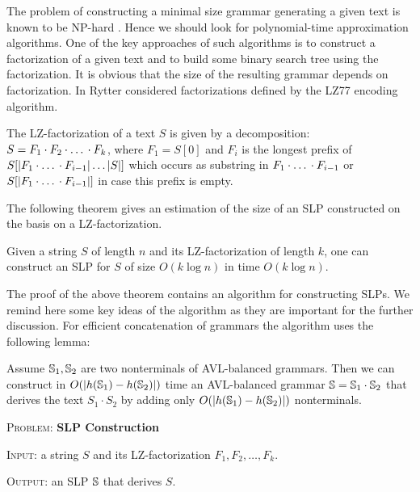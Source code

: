 \documentclass[10pt]{article}
\begin{document}
The problem of constructing a minimal size grammar generating a given text is known to be NP-hard \cite{SmallestCFG}. Hence we
should look for polynomial-time approximation algorithms. One of the key approaches of such algorithms is to construct a
factorization of a given text and to build some binary search tree using the factorization. It is obvious that the size
of the resulting grammar depends on factorization. In \cite{SLPConstruction} Rytter considered factorizations defined by
the LZ77 encoding algorithm.

\begin{definition}
The LZ-factorization of a text $S$ is given by a decomposition: $S = F_1 \cdot F_2 \cdot \mbox{\dots} \cdot F_k$, where
$F_1 = S[0]$ and $F_i$ is the longest prefix of $S[|F_1\cdot \mbox{\dots} \cdot F_{i-1}|\dots|S|]$ which occurs as
substring in $F_1 \cdot \mbox{\dots} \cdot F_{i-1}$ or $S[|F_1\cdot \mbox{\dots} \cdot F_{i-1}|]$ in case this prefix is
empty.
\end{definition}

The following theorem gives an estimation of the size of an SLP constructed on the basis on a LZ-factorization.

\begin{thm}
Given a string $S$ of length $n$ and its LZ-factorization of length $k$, one can construct an SLP for $S$ of size $O(k
\log n)$ in time $O(k \log n)$.
\end{thm}

The proof of the above theorem contains an algorithm for constructing SLPs. We remind here some key ideas of the
algorithm as they are important for the further discussion. For efficient concatenation of grammars the algorithm uses
the following lemma:

\begin{lem}
Assume $\mathbb{S}_1, \mathbb{S}_2$ are two nonterminals of AVL-balanced grammars. Then we can construct in $O(|h(\mathbb{S}_1) -
h(\mathbb{S}_2)|)$ time an AVL-balanced grammar $\mathbb{S} = \mathbb{S}_1 \cdot \mathbb{S}_2$ that derives the text $S_1\cdot S_2$
by adding only $O(|h(\mathbb{S}_1) - h(\mathbb{S}_2)|)$ nonterminals.
\end{lem}


\noindent \textsc{Problem:} \textbf{SLP Construction}

\noindent \textsc{Input:} a string $S$ and its LZ-factorization $F_1, F_2, \dots, F_k$.

\noindent \textsc{Output:} an SLP $\mathbb{S}$ that derives $S$.
\end{document}
